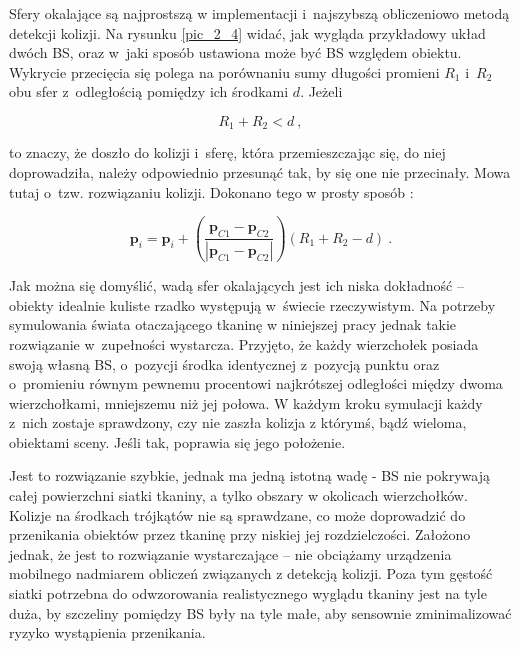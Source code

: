 				
				Sfery okalające są najprostszą w implementacji i~najszybszą obliczeniowo metodą detekcji kolizji. Na rysunku \ref{pic_2_4} widać, jak wygląda przykładowy układ dwóch BS, oraz w~jaki sposób ustawiona może być BS względem obiektu. Wykrycie przecięcia się polega na porównaniu sumy długości promieni \(R_{1}\) i~\(R_{2}\) obu sfer z~odległością pomiędzy ich środkami \(d\). Jeżeli
				
				\begin{equation}
				R_{1} + R_{2} < d \ ,
				\end{equation}
				
				to znaczy, że doszło do kolizji i~sferę, która przemieszczając się, do niej doprowadziła, należy odpowiednio przesunąć tak, by się one nie przecinały. Mowa tutaj o~tzw. rozwiązaniu kolizji. Dokonano tego w prosty sposób \cite{wzory_sfera}:
				
				\begin{equation}
				\mathbf{p}_{i} = \mathbf{p}_{i} + (\frac{\mathbf{p}_{C1} - \mathbf{p}_{C2}}{|\mathbf{p}_{C1} - \mathbf{p}_{C2}|})(R_{1} + R_{2} - d) \ .
				\end{equation}
				
				Jak można się domyślić, wadą sfer okalających jest ich niska dokładność -- obiekty idealnie kuliste rzadko występują w~świecie rzeczywistym. Na potrzeby symulowania świata otaczającego tkaninę w niniejszej pracy jednak takie rozwiązanie w~zupełności wystarcza. Przyjęto, że każdy wierzchołek posiada swoją własną BS, o~pozycji środka identycznej z~pozycją punktu oraz o~promieniu równym pewnemu procentowi najkrótszej odległości między dwoma wierzchołkami, mniejszemu niż jej połowa. W każdym kroku symulacji każdy z~nich zostaje sprawdzony, czy nie zaszła kolizja z którymś, bądź wieloma, obiektami sceny. Jeśli tak, poprawia się jego położenie. 
				
				Jest to rozwiązanie szybkie, jednak ma jedną istotną wadę - BS nie pokrywają całej powierzchni siatki tkaniny, a tylko obszary w okolicach wierzchołków. Kolizje na środkach trójkątów nie są sprawdzane, co może doprowadzić do przenikania obiektów przez tkaninę przy niskiej jej rozdzielczości. Założono jednak, że jest to rozwiązanie wystarczające -- nie obciążamy urządzenia mobilnego nadmiarem obliczeń związanych z detekcją kolizji. Poza tym gęstość siatki potrzebna do odwzorowania realistycznego wyglądu tkaniny jest na tyle duża, by szczeliny pomiędzy BS były na tyle małe, aby sensownie zminimalizować ryzyko wystąpienia przenikania.
				
